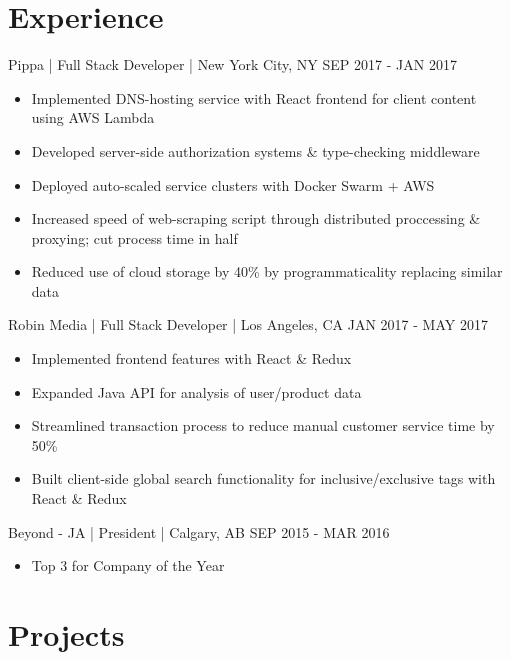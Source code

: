 \documentclass[]{friggeri-cv}
\begin{document}
\section{Experience}

\begin{entrylist}
	\entry
	{Pippa  \normalfont | Full Stack Developer | New York City, NY}
	{SEP 2017 - JAN 2017}
	{
		\begin{itemize}[leftmargin=*]
			\vspace{-0.3cm}
			\item Implemented DNS-hosting service with React frontend for client content using AWS Lambda
			\item Developed server-side authorization systems \&  type-checking middleware
			\item Deployed auto-scaled service clusters with Docker Swarm + AWS
			\item Increased speed of web-scraping script through distributed proccessing \& proxying; cut process time in half
			\item Reduced use of cloud storage by 40\% by programmaticality replacing similar data
		\end{itemize}
	}
	\entry
	{Robin Media \normalfont | Full Stack Developer | Los Angeles, CA}
	{JAN 2017 - MAY 2017}
	{
		\begin{itemize}[leftmargin=*]
			\vspace{-0.3cm}
			\item Implemented frontend features with React \& Redux
			\item Expanded Java API for analysis of user/product data
			\item Streamlined transaction process to reduce manual customer service time by 50\%
			\item Built client-side global search functionality for inclusive/exclusive tags with React \& Redux
		\end{itemize}
	}
	\entry
	{Beyond - JA \normalfont  | President | Calgary, AB}
	{SEP 2015 - MAR 2016}
	{
		\begin{itemize}[leftmargin=*]
			\vspace{-0.3cm}
			\item Top 3 for Company of the Year
		\end{itemize}
	}
\end{entrylist}

\section{Projects}
\end{document}

